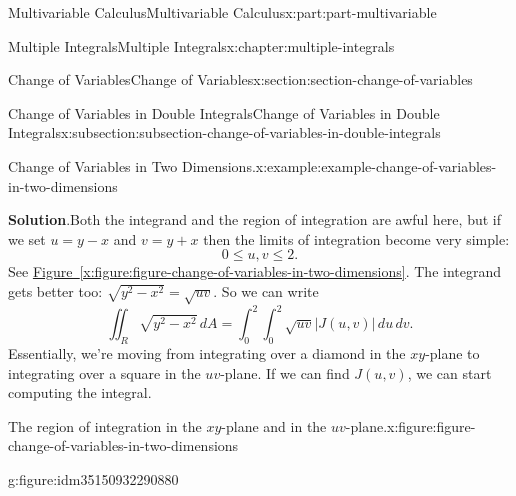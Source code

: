 \documentclass[twoside,10pt,]{book}
\newcommand{\blocktitlefont}{\relax}
\newcommand{\xreffont}{\relax}
\numberwithin{equation}{part}
\begin{document}
\begin{partptx}{Multivariable Calculus}{}{Multivariable Calculus}{}{}{x:part:part-multivariable}
\begin{chapterptx}{Multiple Integrals}{}{Multiple Integrals}{}{}{x:chapter:multiple-integrals}
\begin{sectionptx}{Change of Variables}{}{Change of Variables}{}{}{x:section:section-change-of-variables}
\begin{subsectionptx}{Change of Variables in Double Integrals}{}{Change of Variables in Double Integrals}{}{}{x:subsection:subsection-change-of-variables-in-double-integrals}
\begin{example}{Change of Variables in Two Dimensions.}{x:example:example-change-of-variables-in-two-dimensions}
\par\smallskip%
\noindent\textbf{\blocktitlefont Solution}.\hypertarget{g:solution:idm35150932296384}{}\quad{}Both the integrand and the region of integration are awful here, but if we set \(u = y - x\) and \(v = y + x\) then the limits of integration become very simple:%
\begin{equation*}
0 \leq u,v \leq 2\text{.}
\end{equation*}
See \hyperref[x:figure:figure-change-of-variables-in-two-dimensions]{Figure~{\xreffont\ref{x:figure:figure-change-of-variables-in-two-dimensions}}}. The integrand gets better too: \(\sqrt{y^{2} - x^{2}} = \sqrt{uv}\). So we can write%
\begin{equation*}
\iint_{R}\sqrt{y^{2} - x^{2}}\,dA = \int_{0}^{2}\int_{0}^{2}\sqrt{uv}|J(u,v)|\,du\,dv\text{.}
\end{equation*}
Essentially, we're moving from integrating over a diamond in the \(xy\)-plane to integrating over a square in the \(uv\)-plane. If we can find \(J(u,v)\), we can start computing the integral.%
\begin{figureptx}{The region of integration in the \(xy\)-plane and in the \(uv\)-plane.}{x:figure:figure-change-of-variables-in-two-dimensions}{}%
\begin{sidebyside}{2}{0}{0}{0}%
\begin{sbspanel}{0.5}%
\begin{subfigureptx}{}{g:figure:idm35150932290880}{}%
\end{subfigureptx}
\end{sbspanel}
\end{sidebyside}
\end{figureptx}
\end{example}
\end{subsectionptx}
\end{sectionptx}
\end{chapterptx}
\end{partptx}
\end{document}
